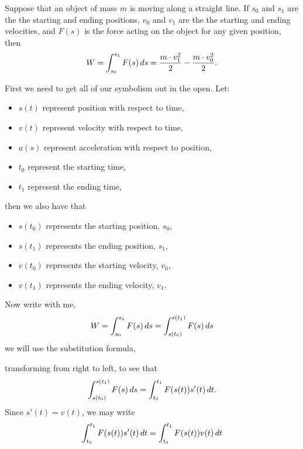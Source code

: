 \documentclass{ximera}
\begin{document}
\begin{theorem}
  Suppose that an object of mass $m$ is moving along a straight
  line. If $s_0$ and $s_1$ are the the starting and ending positions,
  $v_0$ and $v_1$ are the the starting and ending velocities, and
  $F(s)$ is the force acting on the object for any given position,
  then
  \[
  W = \int_{s_0}^{s_1} F(s) \,d s = \frac{m\cdot v_1^2}{2} - \frac{m\cdot v_0^2}{2}.
  \]
  \begin{explanation}
    First we need to get all of our symbolism out in the open. Let:
    \begin{itemize}
    \item $s(t)$ represent position with respect to time,
    \item $v(t)$ represent velocity with respect to time,
    \item $a(s)$ represent acceleration with respect to position,
    \item $t_0$ represent the starting time,
    \item $t_1$ represent the ending time,
    \end{itemize}
    then we also have that
    \begin{itemize}
    \item $s(t_0)$ represents the starting position, $s_0$,
    \item $s(t_1)$ represents the ending position, $s_1$,
    \item $v(t_0)$ represents the starting velocity, $v_0$,
    \item $v(t_1)$ represents the ending velocity, $v_1$.
    \end{itemize}
    Now write with me,
    \[
    W = \int_{s_0}^{s_1} F(s) \,d s = \int_{s(t_0)}^{s(t_1)} F(s) \,d s
    \]
    we will use the substitution formula,
    \begin{image}
  \end{image} 
    transforming from right to left, to see that
    \[
    \int_{s(t_0)}^{s(t_1)} F(s) \,d s = \int_{t_0}^{t_1} F(s(t)) s'(t) \,d t.
    \]
    Since $s'(t) = v(t)$, we may write
    \[
    \int_{t_0}^{t_1} F(s(t)) s'(t) \,d t = \int_{t_0}^{t_1} F(s(t)) v(t) \,d t
    \]

\end{explanation}
\end{theorem}
\end{document}
